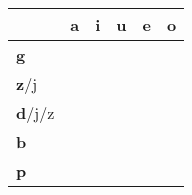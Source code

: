 






\bigskip
\begin{center}	
\Huge

\begin{tabular}{m{2.5cm}||m{1cm}|m{1cm}|m{1cm}|m{1cm}|m{1cm}|}
          &\textbf{a}& \textbf{i}& \textbf{u}& \textbf{e}& \textbf{o}\\ \hline \hline 
\textbf{g}&&&&&\\\hline
\textbf{z}/j&&&&&\\\hline
\textbf{d}/j/z&&&&&\\\hline
\textbf{b}&&&&&\\\hline
\textbf{p}&&&&&\\\hline
\end{tabular}
\end{center}

